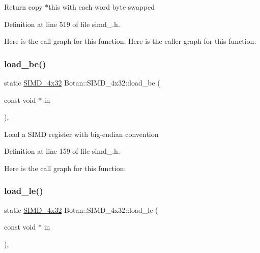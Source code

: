 Return copy $\ast$this with each word byte swapped 

Definition at line 519 of file simd\+\_.\+h.

Here is the call graph for this function\+:
Here is the caller graph for this function\+:
\mbox{\label{class_botan_1_1_s_i_m_d__4x32_a9d47a7d56f29498c1cf8d2b7ff2ad28a}} 
\subsubsection{\texorpdfstring{load\+\_\+be()}{load\_be()}}
{\footnotesize\ttfamily static \mbox{\hyperlink{class_botan_1_1_s_i_m_d__4x32}{S\+I\+M\+D\+\_\+4x32}} Botan\+::\+S\+I\+M\+D\+\_\+4x32\+::load\+\_\+be (\begin{DoxyParamCaption}\item[{const void $\ast$}]{in }\end{DoxyParamCaption})\hspace{0.3cm}{\ttfamily [inline]}, {\ttfamily [static]}}

Load a S\+I\+MD register with big-\/endian convention 

Definition at line 159 of file simd\+\_.\+h.

Here is the call graph for this function\+:
\mbox{\label{class_botan_1_1_s_i_m_d__4x32_af66d289408de2822e808bc06f06db35f}} 
\subsubsection{\texorpdfstring{load\+\_\+le()}{load\_le()}}
{\footnotesize\ttfamily static \mbox{\hyperlink{class_botan_1_1_s_i_m_d__4x32}{S\+I\+M\+D\+\_\+4x32}} Botan\+::\+S\+I\+M\+D\+\_\+4x32\+::load\+\_\+le (\begin{DoxyParamCaption}\item[{const void $\ast$}]{in }\end{DoxyParamCaption})\hspace{0.3cm}{\ttfamily [inline]}, {\ttfamily [static]}}

